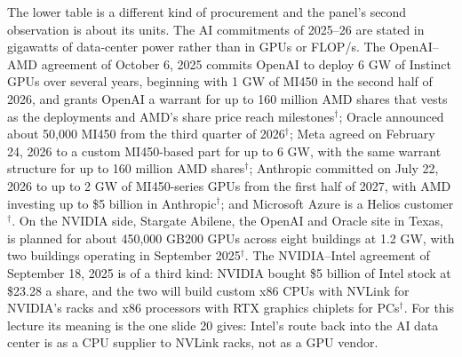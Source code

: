 \documentclass[11pt,letterpaper]{article}
\begin{document}
The lower table is a different kind of procurement and the panel's second observation is about its units. The AI commitments of 2025--26 are stated in gigawatts of data-center power rather than in GPUs or FLOP/s. The OpenAI--AMD agreement of October 6, 2025 commits OpenAI to deploy 6 GW of Instinct GPUs over several years, beginning with 1 GW of MI450 in the second half of 2026, and grants OpenAI a warrant for up to 160 million AMD shares that vests as the deployments and AMD's share price reach milestones$^\dagger$; Oracle announced about 50,000 MI450 from the third quarter of 2026$^\dagger$; Meta agreed on February 24, 2026 to a custom MI450-based part for up to 6 GW, with the same warrant structure for up to 160 million AMD shares$^\dagger$; Anthropic committed on July 22, 2026 to up to 2 GW of MI450-series GPUs from the first half of 2027, with AMD investing up to \$5 billion in Anthropic$^\dagger$; and Microsoft Azure is a Helios customer$^\dagger$. On the NVIDIA side, Stargate Abilene, the OpenAI and Oracle site in Texas, is planned for about 450,000 GB200 GPUs across eight buildings at 1.2 GW, with two buildings operating in September 2025$^\dagger$. The NVIDIA--Intel agreement of September 18, 2025 is of a third kind: NVIDIA bought \$5 billion of Intel stock at \$23.28 a share, and the two will build custom x86 CPUs with NVLink for NVIDIA's racks and x86 processors with RTX graphics chiplets for PCs$^\dagger$. For this lecture its meaning is the one slide 20 gives: Intel's route back into the AI data center is as a CPU supplier to NVLink racks, not as a GPU vendor.
\end{document}
